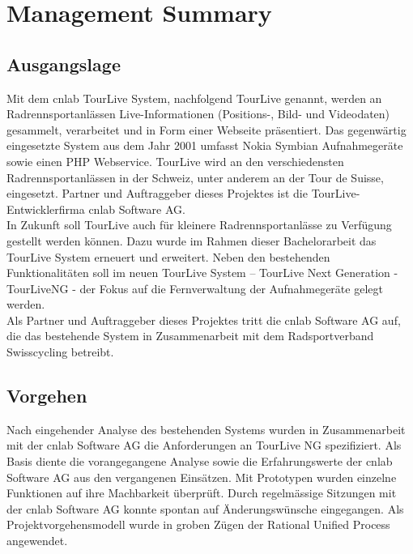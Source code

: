 \chapter*{Management Summary}
\section*{Ausgangslage}

Mit dem cnlab TourLive System, nachfolgend TourLive genannt, werden an Radrennsportanlässen Live-Informationen (Positions-, Bild- und Videodaten) gesammelt, verarbeitet und in Form einer Webseite präsentiert. Das gegenwärtig eingesetzte System aus dem Jahr 2001  umfasst Nokia Symbian Aufnahmegeräte sowie einen PHP Webservice. TourLive wird an den verschiedensten Radrennsportanlässen in der Schweiz, unter anderem an der Tour de Suisse, eingesetzt. Partner und Auftraggeber dieses Projektes ist die TourLive-Entwicklerfirma cnlab Software AG. 
\\

In Zukunft soll TourLive auch für kleinere Radrennsportanlässe zu Verfügung gestellt werden können. Dazu wurde im Rahmen dieser Bachelorarbeit das TourLive System erneuert und erweitert. Neben den bestehenden Funktionalitäten soll im neuen  TourLive System – TourLive Next Generation - TourLiveNG - der Fokus auf die Fernverwaltung der Aufnahmegeräte gelegt werden. 
\\

Als Partner und Auftraggeber dieses Projektes tritt die cnlab Software AG auf, die das bestehende System in Zusammenarbeit mit dem Radsportverband Swisscycling betreibt.


\section*{Vorgehen}
Nach eingehender Analyse des bestehenden Systems wurden in Zusammenarbeit mit der cnlab Software AG die Anforderungen an TourLive NG spezifiziert. Als Basis diente die vorangegangene Analyse sowie die  Erfahrungswerte der cnlab Software AG aus den vergangenen Einsätzen. Mit Prototypen wurden einzelne Funktionen auf ihre Machbarkeit überprüft. Durch regelmässige Sitzungen mit der cnlab Software AG konnte spontan auf Änderungswünsche eingegangen. Als Projektvorgehensmodell wurde in groben Zügen der Rational Unified Process angewendet. 
\\

